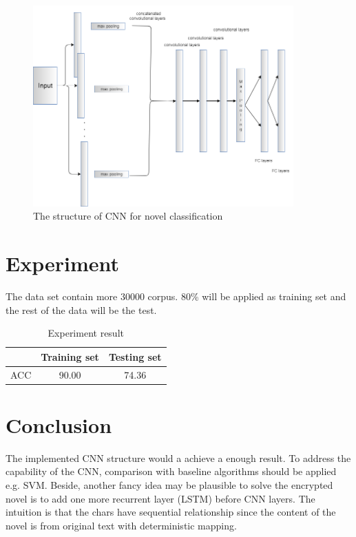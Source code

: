 \documentclass[a4paper]{article}
\begin{document}
\begin{figure}
\begin{center}
\includegraphics[width=10cm]{CNN_structure.png}
\end{center}
\caption{The structure of CNN for novel classification}\label{cnn}
\end{figure}

\section{Experiment}\label{exp}

The data set contain more 30000 corpus. 80\% will be applied as training set and the rest of the data will be the test. 
\begin{table}
\centering
\begin{tabular}{|c|c|c|}
  \hline
   {} & Training set & Testing set \\
  \hline
  ACC & 90.00 & 74.36 \\
  \hline
\end{tabular}\caption{Experiment result}
\end{table}
\section{Conclusion}\label{conclusion}
The implemented CNN structure would a achieve a enough result. To address the capability of the CNN, comparison with baseline algorithms should be applied e.g. SVM. Beside, another fancy idea may be plausible to solve the encrypted novel is to add one more recurrent layer (LSTM) before CNN layers. The intuition is that the chars have sequential relationship since the content of the novel is from original text with deterministic mapping.



\end{document}
